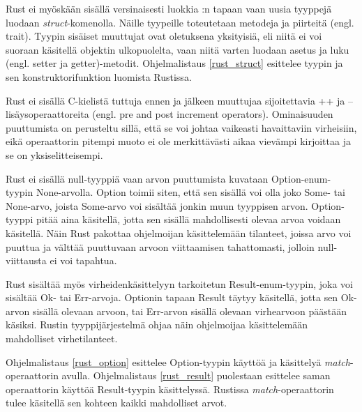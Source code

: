\begin{minipage}{\linewidth}

\end{minipage}

Rust ei myöskään sisällä versinaisesti luokkia \Cpp:n tapaan vaan uusia tyyppejä luodaan \textit{struct}-komenolla. Näille tyypeille toteutetaan metodeja ja piirteitä (engl. trait). Tyypin sisäiset muuttujat ovat oletuksena yksityisiä, eli niitä ei voi suoraan käsitellä objektin ulkopuolelta, vaan niitä varten luodaan asetus ja luku (engl. setter ja getter)-metodit. Ohjelmalistaus \ref{rust_struct} esittelee tyypin ja sen konstruktorifunktion luomista Rustissa.

\begin{minipage}{\linewidth}

\end{minipage}

Rust ei sisällä C-kielistä tuttuja ennen ja jälkeen muuttujaa sijoitettavia ++ ja -- lisäysoperaattoreita (engl. pre and post increment operators). Ominaisuuden puuttumista on perusteltu sillä, että se voi johtaa vaikeasti havaittaviin virheisiin, eikä operaattorin pitempi muoto ei ole merkittävästi aikaa vievämpi kirjoittaa ja se on yksiselitteisempi\cite{rustfaq}.

Rust ei sisällä null-tyyppiä vaan arvon puuttumista kuvataan Option-enum-tyypin None-arvolla. Option toimii siten, että sen sisällä voi olla joko Some- tai None-arvo, joista Some-arvo voi sisältää jonkin muun tyyppisen arvon. Option-tyyppi pitää aina käsitellä, jotta sen sisällä mahdollisesti olevaa arvoa voidaan käsitellä. Näin Rust pakottaa ohjelmoijan käsittelemään tilanteet, joissa arvo voi puuttua ja välttää puuttuvaan arvoon viittaamisen tahattomasti, jolloin null-viittausta ei voi tapahtua.~\cite[chapter~6.1]{rustbook}

Rust sisältää myös virheidenkäsittelyyn tarkoitetun Result-enum-tyypin, joka voi sisältää Ok- tai Err-arvoja. Optionin tapaan Result täytyy käsitellä, jotta sen Ok-arvon sisällä olevaan arvoon, tai Err-arvon sisällä olevaan virhearvoon päästään käsiksi. Rustin tyyppijärjestelmä ohjaa näin ohjelmoijaa käsittelemään mahdolliset virhetilanteet.~\cite[chapter~6.1]{rustbook}

Ohjelmalistaus \ref{rust_option} esittelee Option-tyypin käyttöä ja käsittelyä \textit{match}-operaattorin avulla. Ohjelmalistaus \ref{rust_result} puolestaan esittelee saman operaattorin käyttöä Result-tyypin käsittelyssä. Rustissa \textit{match}-operaattorin tulee käsitellä sen kohteen kaikki mahdolliset arvot.

